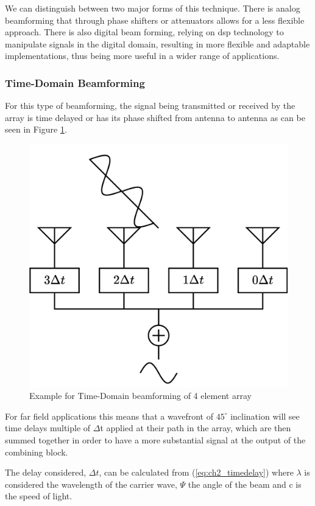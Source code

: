 \par We can distinguish between two major forms of this technique. There is analog beamforming that through phase shifters or attenuators allows for a less flexible approach. There is also digital beam forming, relying on \ac{dsp} technology to manipulate signals in the digital domain, resulting in more flexible and adaptable implementations, thus being more useful in a wider range of applications.

\subsubsection{Time-Domain Beamforming}
\par For this type of beamforming, the signal being transmitted or received by the array is time delayed or has its phase shifted from antenna to antenna as can be seen in Figure \ref{fig:ch_2_secArray_Array_Time_Delay}.

\begin{figure}[H]
    \vspace*{0cm}
    \centering
    \includegraphics[width=0.5\linewidth]{figs/ch_2_secArray_Array_Time_Delay.png}
    \caption{Example for Time-Domain beamforming of 4 element array}
    \label{fig:ch_2_secArray_Array_Time_Delay}
\end{figure}

\par For far field applications this means that a wavefront of $45^{\circ}$ inclination will see time delays multiple of $\Delta$t applied at their path in the array, which are then summed together in order to have a more substantial signal at the output of the combining block.

\par The delay considered, $\Delta t$, can be calculated from (\ref{eq:ch2_timedelay}) \cite{Jang2018ABeamformer} where $\lambda$ is considered the wavelength of the carrier wave, $\Psi$ the angle of the beam and c is the speed of light.

